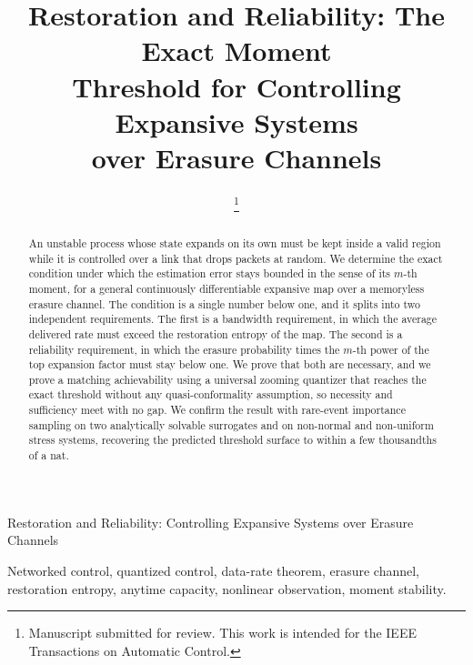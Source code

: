 \documentclass[journal]{IEEEtran}
\theoremstyle{definition}
\theoremstyle{remark}
\begin{document}
\title{Restoration and Reliability: The Exact Moment\\ Threshold for Controlling Expansive Systems\\ over Erasure Channels}

\author{\thanks{Manuscript submitted for review. This work is intended for the IEEE Transactions on Automatic Control.}}

%
{Restoration and Reliability: Controlling Expansive Systems over Erasure Channels}

\maketitle

\begin{abstract}
An unstable process whose state expands on its own must be kept inside a valid region while it is controlled over
a link that drops packets at random. We determine the exact condition under which the estimation error stays
bounded in the sense of its $m$-th moment, for a general continuously differentiable expansive map over a
memoryless erasure channel. The condition is a single number below one, and it splits into two independent
requirements. The first is a bandwidth requirement, in which the average delivered rate must exceed the
restoration entropy of the map. The second is a reliability requirement, in which the erasure probability times
the $m$-th power of the top expansion factor must stay below one. We prove that both are necessary, and we prove
a matching achievability using a universal zooming quantizer that reaches the exact threshold without any
quasi-conformality assumption, so necessity and sufficiency meet with no gap. We confirm the result with
rare-event importance sampling on two analytically solvable surrogates and on non-normal and non-uniform stress
systems, recovering the predicted threshold surface to within a few thousandths of a nat.
\end{abstract}

\begin{IEEEkeywords}
Networked control, quantized control, data-rate theorem, erasure channel, restoration entropy, anytime capacity,
nonlinear observation, moment stability.
\end{IEEEkeywords}

\end{document}
